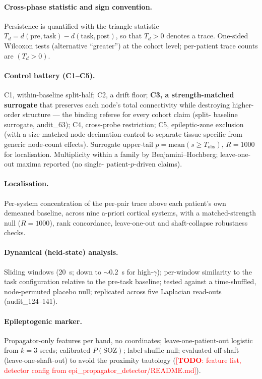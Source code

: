 \documentclass[11pt]{article}
\newcommand{\TODO}[1]{\textcolor{red}{[\textbf{TODO}: #1]}}
\begin{document}
\paragraph{Cross-phase statistic and sign convention.}
Persistence is quantified with the triangle statistic
$T_d = d(\text{pre},\text{task}) - d(\text{task},\text{post})$, so that $T_d>0$
denotes a trace. One-sided Wilcoxon tests (alternative ``greater'') at the cohort
level; per-patient trace counts are $(T_d>0)$.

\paragraph{Control battery (C1--C5).}
C1, within-baseline split-half; C2, a drift floor; \textbf{C3, a strength-matched
surrogate} that preserves each node's total connectivity while destroying
higher-order structure --- the binding referee for every cohort claim (split-
baseline surrogate, audit\_63); C4, cross-probe restriction; C5,
epileptic-zone exclusion (with a size-matched node-decimation control to separate
tissue-specific from generic node-count effects). Surrogate upper-tail
$p=\mathrm{mean}(s\ge T_{\text{obs}})$, $R=1000$ for localisation. Multiplicity
within a family by Benjamini--Hochberg; leave-one-out maxima reported (no single-
patient-$p$-driven claims).

\paragraph{Localisation.}
Per-system concentration of the per-pair trace above each patient's own demeaned
baseline, across nine a-priori cortical systems, with a matched-strength null
($R=1000$), rank concordance, leave-one-out and shaft-collapse robustness checks.

\paragraph{Dynamical (held-state) analysis.}
Sliding windows (20~s; down to $\sim0.2$~s for high-$\gamma$); per-window
similarity to the task configuration relative to the pre-task baseline; tested
against a time-shuffled, node-permuted placebo null; replicated across five
Laplacian read-outs (audit\_124--141).

\paragraph{Epileptogenic marker.}
Propagator-only features per band, no coordinates; leave-one-patient-out logistic
from $k=3$ seeds; calibrated $P(\mathrm{SOZ})$; label-shuffle null; evaluated
off-shaft (leave-one-shaft-out) to avoid the proximity tautology
(\TODO{feature list, detector config from epi\_propagator\_detector/README.md}).
\end{document}
